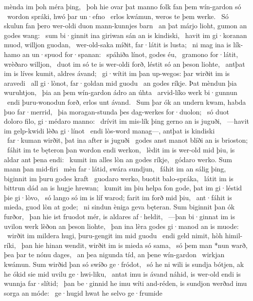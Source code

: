 mènda im þoh méra þing, \hld\ þoh hie ovar þat manno folk
fan þem wín-gardon só \hld\ wordon spráki,
hwó þar un·efno \hld\ erlos kwámun,
weros te þem werke. \hld\ Só skulun fan þero wer-oldi duon
mann-kunnjes barn \hld\ an þat márjo lioht,
gumon an godes wang: \hld\ sum bi·ginnit ina giriwan sán
an is kindiski, \hld\ havit im gi·koranan muod,
willjon guodan, \hld\ wer-old-saka míðit,
far·látit is lusta; \hld\ ni mag ina is lík-hamo
an un·spuod for·spanan: \hld\ spáhiða línot,
godes éu, \hld\ gramono for·látit,
wrèðaro willjon, \hld\ duot im só te is wer-oldi forð,
léstit só an þeson liohte, \hld\ antþat im is líves kumit,
aldres ávand; \hld\ gi·wítit im þan up-wegos:
þar wirðit im is aravedi \hld\ all gi·lònot,
far·goldan mid guodu \hld\ an godes ríkje.
Þat mèndun þia wuruhtjon, \hld\ þia an þem wín-gardon
ádro an úhta \hld\ arvid-líko
werk bi·gunnun \hld\ endi þuru-wonodun forð,
erlos unt ávand. \hld\ Sum þar ók an undern kwam,
habda þuo far·merrid, \hld\ þia moragan-stunda
þes dag-werkes for·duolon; \hld\ só duot doloro filo,
gi·médaro manno: \hld\ drívit im mis-lík þing
gerno an is juguði, \hld\ —havit im gelp-kwidi
lèða gi·línot \hld\ endi lòs-word manag—,
antþat is kindiski \hld\ far·kuman wirðit,
þat ina after is juguði \hld\ godes anst manot
blíði an is brioston; \hld\ fáhit im te bęteron þan
wordon endi werkon, \hld\ lèdit im is wer-old mid þiu,
is aldar ant þena endi: \hld\ kumit im alles lòn
an godes ríkje, \hld\ gódaro werko.
Sum mann þan mid-firi \hld\ mèn far·látid,
swára sundjun, \hld\ fáhit im an sálig þing,
biginnit im þuru godes kraft \hld\ guodaro werko,
buotit balo-spráka, \hld\ látit im is bittrun dád
an is hugje hrewan; \hld\ kumit im þiu helpa fon gode,
þat im gi·léstid þie gi·lòvo, \hld\ só lango só im is líf warod;
farit im forð mid þiu, \hld\ ant·fáhit is mieda,
guod lòn at gode; \hld\ ni sindun èniga geva bęteran.
Sum biginnit þan ók furðor, \hld\ þan hie ist fruodot mér,
is aldares af·heldit, \hld\ —þan bi·ginnat im is uvilon werk
lèðon an þeson liohte, \hld\ þan ina lèra godes
gi·manod an is muode: \hld\ wirðit im mildera hugi,
þuru-gengit im mid guodu \hld\ endi geld nimit,
hòh himil-ríki, \hld\ þan hie hinan wendit,
wirðit im is mieda só sama, \hld\ só þem man *nun warð,
þea þar te nónu dages, \hld\ an þea nigunda tíd,
an þene wín-gardon \hld\ wirkjan kwámun.
Sum wirðid þan só swíðo ge·fródot, \hld\ só he ni wili is sundja bótjen,
ak he ókid sie mid uvilu ge·hwi-liku, \hld\ antat imu is ávand náhid,
is wer-old endi is wunnja far·slítid; \hld\ þan be·ginnid he imu wíti and-réden,
is sundjon werðad imu sorga an móde: \hld\ ge·hugid hwat he selvo ge·frumide

